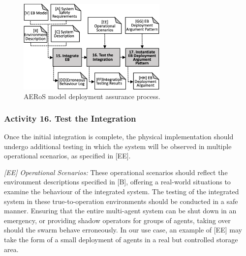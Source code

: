 \documentclass[runningheads]{llncs}
\begin{document}
\begin{figure}[!t]
	\centering
	\includegraphics[width=0.65\textwidth]{figures/AMLAS-STAGE-6-V4.png}%
	\vspace{-2ex}
	\caption{AERoS model deployment assurance process.}
	\label{amlas-a-stage6}
	\vspace{-4ex}
\end{figure}



\subsubsection*{Activity 16. Test the Integration}

Once the initial integration is complete, the physical implementation should undergo additional testing in which the system will be observed in multiple operational scenarios, as specified in [EE].

\emph{[EE] Operational Scenarios:} These operational scenarios should reflect the environment descriptions specified in [B], offering a real-world situations to examine the behaviour of the integrated system. The testing of the integrated system in these true-to-operation environments should be conducted in a safe manner. Ensuring that the entire multi-agent system can be shut down in an emergency, or providing shadow operators for groups of agents, taking over should the swarm behave erroneously. In our use case, an example of [EE] may take the form of a small deployment of agents in a real but controlled storage area.


\end{document}
